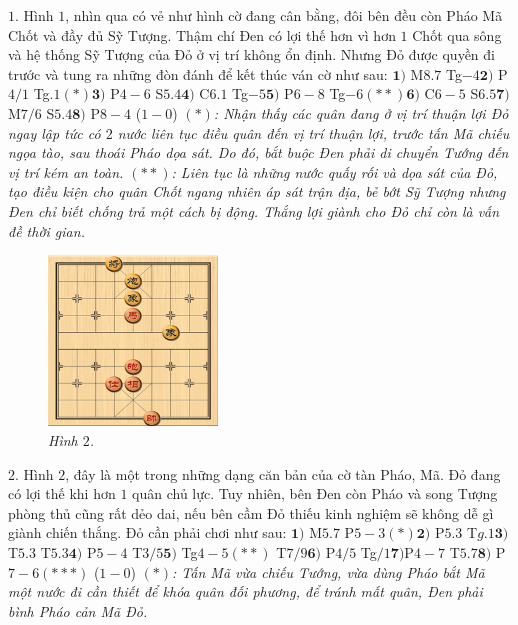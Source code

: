\begin{multicols}{2}
	$1.$ Hình $1$, nhìn qua có vẻ như hình cờ đang cân bằng, đôi bên đều còn Pháo Mã Chốt và đầy đủ Sỹ Tượng. Thậm chí Đen có lợi thế hơn vì hơn $1$ Chốt qua sông và hệ thống Sỹ Tượng của Đỏ ở vị trí không ổn định. Nhưng Đỏ được quyền đi trước và tung ra những đòn đánh để kết thúc ván cờ như sau:
	\vskip 0.1cm
	$\pmb{1)}$ M$8.7$ Tg$-4$\quad $\pmb{2)}$ P$4/1$ Tg$.1$$(*)$\quad $\pmb{3)}$ P$4-6$ S$5.4$\quad $\pmb{4)}$ C$6.1$ Tg$-5$\quad $\pmb{5)}$ P$6-8$ Tg$-6$$(**)$\quad $\pmb{6)}$ C$6-5$ S$6.5$\quad $\pmb{7)}$ M$7/6$ S$5.4$\quad $\pmb{8)}$ P$8-4$ ($1-0$)
	\vskip 0.1cm
	\textit{$(*)$: Nhận thấy các quân đang ở vị trí thuận lợi Đỏ ngay lập tức có $2$ nước liên tục điều quân đến vị trí thuận lợi, trước tấn Mã chiếu ngọa tào, sau thoái Pháo dọa sát. Do đó, bắt buộc Đen phải di chuyển  Tướng đến vị trí kém an toàn.
	\vskip 0.1cm
	$(**)$: Liên tục là những nước quấy rối và dọa sát của Đỏ, tạo điều kiện cho quân Chốt ngang nhiên áp sát trận địa, bẻ bớt Sỹ Tượng nhưng Đen chỉ biết chống trả một cách bị động. Thắng lợi giành cho Đỏ chỉ còn là vấn đề thời gian. }
	\begin{figure}[H]
		\centering
		\vspace*{-5pt}
		\captionsetup{labelformat= empty, justification=centering}
		\includegraphics[width=0.4\textwidth]{2}
		\caption{\small\textit{\color{gocco}Hình $2$.}}
		\vspace*{-10pt}
	\end{figure}
	$2$. Hình $2$, đây là một trong những dạng căn bản của cờ tàn Pháo, Mã. Đỏ đang có lợi thế khi hơn $1$ quân chủ lực. Tuy nhiên, bên Đen còn Pháo và song Tượng phòng thủ cũng rất dẻo dai, nếu bên cầm Đỏ thiếu kinh nghiệm sẽ không dễ gì giành chiến thắng. Đỏ cần phải chơi như sau:
	\vskip 0.1cm 
	$\pmb{1)}$	M$5.7$ P$5-3$$(*)$\quad $\pmb{2)}$ P$5.3$ T$g.1$\quad $\pmb{3)}$ T$5.3$ T$5.3$\quad  $\pmb{4)}$ P$5-4$ T$3/5$\quad $\pmb{5)}$ Tg$4-5$$(**)$ T$7/9$\quad $\pmb{6)}$ P$4/5$ Tg$/1$\quad $\pmb{7)}$P$4-7$ T$5.7$\quad $\pmb{8)}$ P$7-6$$(***)$ ($1-0$)
	\vskip 0.1cm
	\textit{$(*)$: Tấn Mã vừa chiếu Tướng, vừa dùng Pháo bắt Mã một nước đi cần thiết để khóa quân đối phương, để tránh mất quân, Đen phải bình Pháo cản Mã Đỏ.
}$$
\end{multicols}
